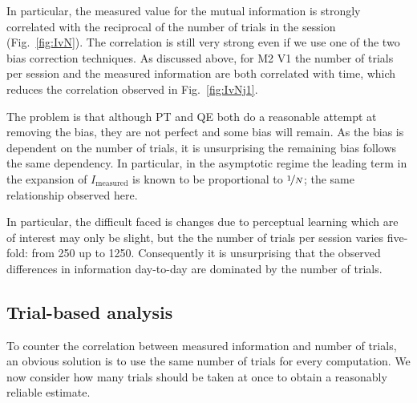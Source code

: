 In particular, the measured value for the mutual information is strongly correlated with the reciprocal of the number of trials in the session (Fig.~\ref{fig:IvN}).
The correlation is still very strong even if we use one of the two bias correction techniques.
As discussed above, for \ac{M2} \ac{V1} the number of trials per session and the measured information  are both correlated with time, which reduces the correlation observed in Fig.~\ref{fig:IvNj1}.

The problem is that although \ac{PT} and \ac{QE} both do a reasonable attempt at removing the bias, they are not perfect and some bias will remain.
As the bias is dependent on the number of trials, it is unsurprising the remaining bias follows the same dependency.
In particular, in the asymptotic regime the leading term in the expansion of $I_{\text{measured}}$ is known to be proportional \cite{Treves1995} to $\nicefrac{1}{N}$; the same relationship observed here.

In particular, the difficult faced is changes due to perceptual learning which are of interest may only be slight, but the the number of trials per session varies five-fold: from 250 up to 1250.
Consequently it is unsurprising that the observed differences in information day-to-day are dominated by the number of trials.

% 

\FloatBarrier
\subsection{Trial-based analysis}

To counter the correlation between measured information and number of trials, an obvious solution is to use the same number of trials for every computation.
We now consider how many trials should be taken at once to obtain a reasonably reliable estimate.

